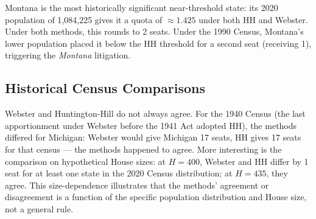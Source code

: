 Montana is the most historically significant near-threshold state:
its 2020 population of 1{,}084{,}225 gives it a quota of $\approx 1.425$
under both HH and Webster.
Under both methods, this rounds to 2 seats.
Under the 1990 Census, Montana's lower population placed it below the
HH threshold for a second seat (receiving 1), triggering the
\textit{Montana} litigation.

\subsection{Historical Census Comparisons}

Webster and Huntington-Hill do not always agree.
For the 1940 Census (the last apportionment under Webster before
the 1941 Act adopted HH), the methods differed for Michigan:
Webster would give Michigan 17 seats, HH gives 17 seats for that
census --- the methods happened to agree.
More interesting is the comparison on hypothetical House sizes:
at $H = 400$, Webster and HH differ by 1 seat for at least one state
in the 2020 Census distribution; at $H = 435$, they agree.
This size-dependence illustrates that the methods' agreement or
disagreement is a function of the specific population distribution
and House size, not a general rule.
